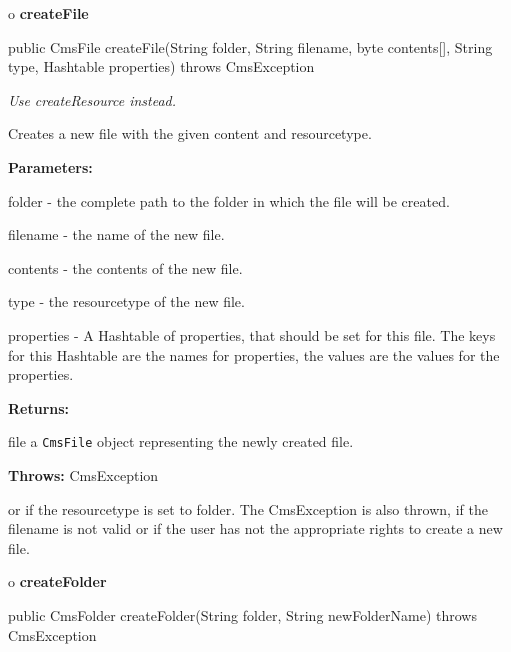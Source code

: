 o {\bf createFile}

\begin{PRE}
 public CmsFile createFile(String folder,
                           String filename,
                           byte contents[],
                           String type,
                           Hashtable properties) throws CmsException
\end{PRE}

\begin{description}
 {\it Use createResource
instead.}

Creates a new file with the given content and resourcetype.

\begin{description}
\item {\bf Parameters:}

folder - the complete path to the folder in which the file will be created.

filename - the name of the new file.

contents - the contents of the new file.

type - the resourcetype of the new file.

properties - A Hashtable of properties, that should be set for this file. The
keys for this Hashtable are the names for properties, the values are the
values for the properties.
\item {\bf Returns:}

file a {\tt CmsFile} object representing the newly created file.
\item {\bf Throws:} CmsException

or if the resourcetype is set to folder. The CmsException is also thrown, if
the filename is not valid or if the user has not the appropriate rights to
create a new file.
\end{description}

\end{description}

o {\bf createFolder}

\begin{PRE}
 public CmsFolder createFolder(String folder,
                               String newFolderName) throws CmsException
\end{PRE}

